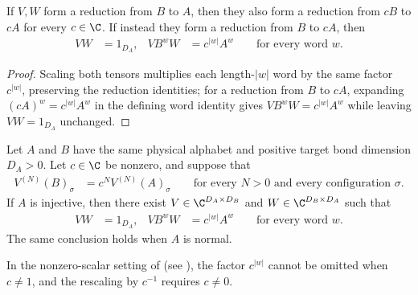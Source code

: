 \begin{lemma}
    \label{lem:mps_reduction_scalar_covariance}
    \leanok
    If $V,W$ form a reduction from $B$ to $A$, then they also form a reduction
    from $cB$ to $cA$ for every $c\in\C$.  If instead they form a reduction
    from $B$ to $cA$, then
    \begin{align}
        VW & =1_{D_A},
           & VB^wW     & =c^{|w|}A^w
        \qquad\text{for every word }w.
        \label{eq:mps_reduction_scalar_covariance}
    \end{align}
\end{lemma}

\begin{proof}
    \leanok
    Scaling both tensors multiplies each length-$|w|$ word by the same factor
    $c^{|w|}$, preserving the reduction identities; for a reduction from $B$
    to $cA$, expanding $(cA)^w=c^{|w|}A^w$ in the defining word identity gives
    $VB^wW=c^{|w|}A^w$ while leaving $VW=1_{D_A}$ unchanged.
\end{proof}

\begin{lemma}
    \label{thm:mps_proportional_reduction_exists}
    \leanok
    Let $A$ and $B$ have the same physical alphabet and positive target bond
    dimension $D_A>0$.  Let $c\in\C$ be nonzero, and suppose that
    \begin{align}
        V^{(N)}(B)_\sigma
         & =c^N V^{(N)}(A)_\sigma
        \qquad\text{for every }N>0\text{ and every configuration }\sigma.
        \label{eq:mps_proportional_reduction_hypothesis}
    \end{align}
    If $A$ is injective, then there exist
    $V\in\C^{D_A\times D_B}$ and $W\in\C^{D_B\times D_A}$ such that
    \begin{align}
        VW & =1_{D_A},
           & VB^wW     & =c^{|w|}A^w
        \qquad\text{for every word }w.
        \label{eq:mps_proportional_reduction_word_relation}
    \end{align}
    The same conclusion holds when $A$ is normal.

    In the nonzero-scalar setting of
    \cite[Proposition~20]{Molnar2018SemiInjective} (see
    \cite{gap:mgsc18_reduction_proportionality_scalar}), the factor $c^{|w|}$
    cannot be omitted when $c\ne1$, and the rescaling by $c^{-1}$ requires
    $c\ne0$.
\end{lemma}

